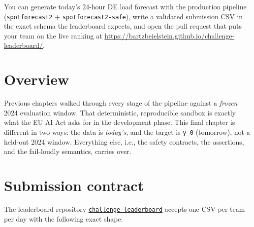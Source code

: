 \documentclass[
  english,
  letterpaper,
]{scrbook}
\begin{document}
\begin{tcolorbox}[enhanced jigsaw, arc=.35mm, bottomrule=.15mm, bottomtitle=1mm, breakable, colback=white, colbacktitle=quarto-callout-note-color!10!white, colframe=quarto-callout-note-color-frame, coltitle=black, left=2mm, leftrule=.75mm, opacityback=0, opacitybacktitle=0.6, rightrule=.15mm, title=\textcolor{quarto-callout-note-color}{\faInfo}\hspace{0.5em}{Learning objective}, titlerule=0mm, toprule=.15mm, toptitle=1mm]

You can generate today's 24-hour DE load forecast with the production
pipeline (\texttt{spotforecast2} + \texttt{spotforecast2-safe}), write a
validated submission CSV in the exact schema the leaderboard expects,
and open the pull request that puts your team on the live ranking at
\url{https://bartzbeielstein.github.io/challenge-leaderboard/}.

\end{tcolorbox}

\section{Overview}\label{sec-live-overview}

Previous chapters walked through every stage of the pipeline against a
\emph{frozen} 2024 evaluation window. That deterministic, reproducible
sandbox is exactly what the EU AI Act asks for in the development phase.
This final chapter is different in two ways: the data is \emph{today's},
and the target is \texttt{y\_0} (tomorrow), not a held-out 2024 window.
Everything else, i.e., the safety contracts, the assertions, and the
fail-loudly semantics, carries over.

\section{Submission contract}\label{sec-live-contract}

The leaderboard repository
\href{https://github.com/bartzbeielstein/challenge-leaderboard}{\texttt{challenge-leaderboard}}
accepts one CSV per team per day with the following exact shape:
\end{document}
